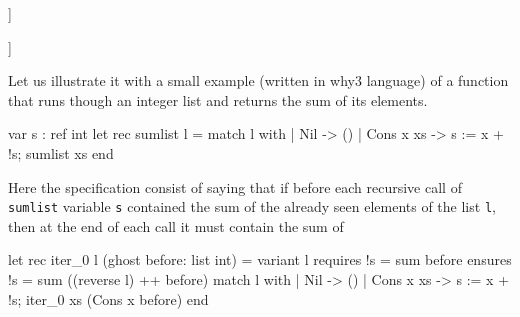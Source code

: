 		{\tstep{\Gamma}{\varepsilon x}{\sigma[\overline{\alpha}} \mapsfrom \overline{\tau}]}

		{\tstep{\Gamma}{\texttt{op}}{\sigma[\overline{\alpha}} \mapsfrom \overline{\tau}]}
		
		
Let us illustrate it with a small example (written in why3 language) 
 of a function that runs though an integer list  and returns the sum of its elements.   
	\begin{whycode}   
var s : ref int
let rec sumlist l =
    match l with
      | Nil -> ()
      | Cons x xs -> s := x + !s; sumlist xs 
    end
    \end{whycode}
Here the specification consist of saying that if before each recursive call of \texttt{sumlist} 
variable \texttt{s} contained the sum of the already seen elements of the list \texttt{l},
then at the end of each call it must contain the sum of 

 \begin{whycode}
let rec iter_0 l (ghost before: list int) =
    variant  { l }
    requires { !s = sum before }
    ensures  { !s = sum ((reverse l) ++ before) }
    match l with
      | Nil -> ()
      | Cons x xs -> s := x + !s; iter_0 xs (Cons x before)
    end

  \end{whycode}
 
